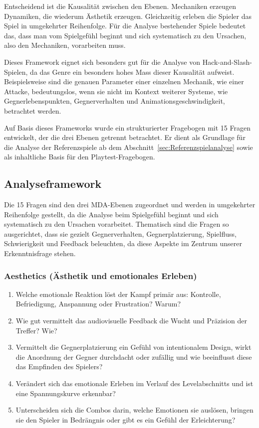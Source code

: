 \documentclass[../Main.tex]{subfiles}
\begin{document}
Entscheidend ist die Kausalität zwischen den Ebenen. Mechaniken erzeugen Dynamiken, die wiederum Ästhetik erzeugen. Gleichzeitig erleben die Spieler das Spiel in umgekehrter Reihenfolge. Für die Analyse bestehender Spiele bedeutet das, dass man vom Spielgefühl beginnt und sich systematisch zu den Ursachen, also den Mechaniken, vorarbeiten muss.

Dieses Framework eignet sich besonders gut für die Analyse von Hack-and-Slash-Spielen, da das Genre ein besonders hohes Mass dieser Kausalität aufweist. Beispielsweise sind die genauen Parameter einer einzelnen Mechanik, wie einer Attacke, bedeutungslos, wenn sie nicht im Kontext weiterer Systeme, wie Gegnerlebenspunkten, Gegnerverhalten und Animationsgeschwindigkeit, betrachtet werden.\autocite{hunicke2004mda}

Auf Basis dieses Frameworks wurde ein strukturierter Fragebogen mit 15 Fragen entwickelt, der die drei Ebenen getrennt betrachtet. Er dient als Grundlage für die Analyse der Referenzspiele ab dem Abschnitt~\ref{sec:Referenzspielanalyse} sowie als inhaltliche Basis für den Playtest-Fragebogen.


\subsection{Analyseframework} \label{sec:Analysefragebogen}

Die 15 Fragen sind den drei MDA-Ebenen zugeordnet und werden in umgekehrter Reihenfolge gestellt, da die Analyse beim Spielgefühl beginnt und sich systematisch zu den Ursachen vorarbeitet. Thematisch sind die Fragen so ausgerichtet, dass sie gezielt Gegnerverhalten, Gegnerplatzierung, Spielfluss, Schwierigkeit und Feedback beleuchten, da diese Aspekte im Zentrum unserer Erkenntnisfrage stehen.

\subsubsection{Aesthetics (Ästhetik und emotionales Erleben)}

\begin{enumerate}[label=\textbf{A\arabic*}, leftmargin=1.5cm, itemsep=0.5em]
    \item Welche emotionale Reaktion löst der Kampf primär aus: Kontrolle, Befriedigung, Anspannung oder Frustration? Warum?
    \item Wie gut vermittelt das audiovisuelle Feedback die Wucht und Präzision der Treffer? Wie?
    \item Vermittelt die Gegnerplatzierung ein Gefühl von intentionalem Design, wirkt die Anordnung der Gegner durchdacht oder zufällig und wie beeinflusst diese das Empfinden des Spielers?
    \item Verändert sich das emotionale Erleben im Verlauf des Levelabschnitts und ist eine Spannungskurve erkennbar?
    \item Unterscheiden sich die Combos darin, welche Emotionen sie auslösen, bringen sie den Spieler in Bedrängnis oder gibt es ein Gefühl der Erleichterung?
\end{enumerate}
\end{document}
